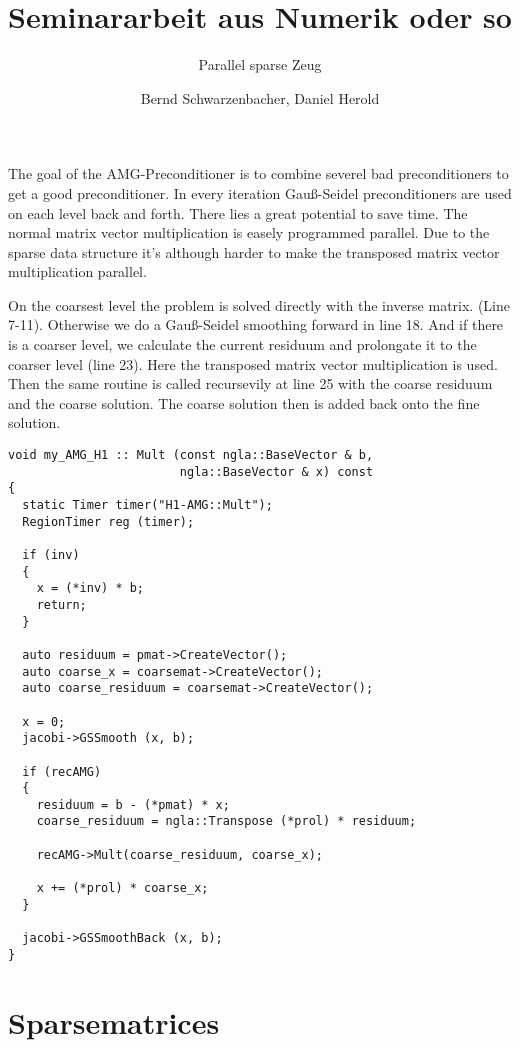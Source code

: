 \documentclass[a4paper,11pt]{scrartcl}
\title{Seminararbeit aus Numerik oder so}
\subtitle{Parallel sparse Zeug}
\author{Bernd Schwarzenbacher, Daniel Herold}
\begin{document}
\maketitle
\tableofcontents

\pagebreak


The goal of the AMG-Preconditioner is to combine severel bad preconditioners to
get a good preconditioner.
In every iteration Gauß-Seidel preconditioners are used on each level back and
forth. There lies a great potential to save time.
The normal matrix vector multiplication is easely programmed parallel. Due to
the sparse data structure it's although harder to make the transposed matrix
vector multiplication parallel.

On the coarsest level the problem is solved directly with the inverse matrix.
(Line 7-11).  
Otherwise we do a Gauß-Seidel smoothing forward in line 18.
And if there is a coarser level, we calculate the current residuum and
prolongate it to the coarser level (line 23). Here the transposed
matrix vector multiplication is used. Then the same routine is called
recursevily at line 25 with the coarse residuum and the coarse solution. The
coarse solution then is added back onto the fine solution.

\begin{lstlisting}
void my_AMG_H1 :: Mult (const ngla::BaseVector & b,
                        ngla::BaseVector & x) const
{
  static Timer timer("H1-AMG::Mult");
  RegionTimer reg (timer);

  if (inv)
  {
    x = (*inv) * b;
    return;
  }

  auto residuum = pmat->CreateVector();
  auto coarse_x = coarsemat->CreateVector();
  auto coarse_residuum = coarsemat->CreateVector();

  x = 0;
  jacobi->GSSmooth (x, b);

  if (recAMG)
  {
    residuum = b - (*pmat) * x;
    coarse_residuum = ngla::Transpose (*prol) * residuum;

    recAMG->Mult(coarse_residuum, coarse_x);

    x += (*prol) * coarse_x;
  }

  jacobi->GSSmoothBack (x, b);
}
\end{lstlisting}

\section{Sparsematrices}
\end{document}
